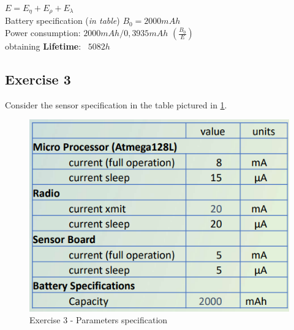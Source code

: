 \begin{center}
	$E = E_{\eta} + E_{\rho} + E_{\lambda}$\\
	Battery specification (\textit{in table}) $B_{0} = 2000mAh$\\
	Power consumption: $2000 mAh / 0,3935 mAh$     $(\frac{B_{0}}{E})$\\
	obtaining \textbf{Lifetime}:  $5082 h$
\end{center}




\subsection{Exercise 3}
Consider the sensor specification in the table pictured in \ref{chenergy-ex3}.
\begin{figure}
	\centering\includegraphics[scale=0.50]{images/Pasted image 20230328162514.png}
	\caption{Exercise 3 - Parameters specification}
	\label{chenergy-ex3}
\end{figure}

